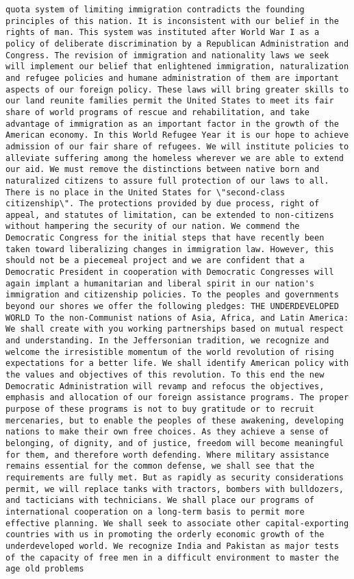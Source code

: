 \documentclass[
]{article}
\begin{document}
\begin{verbatim}
quota system of limiting immigration contradicts the founding principles of this nation. It is inconsistent with our belief in the rights of man. This system was instituted after World War I as a policy of deliberate discrimination by a Republican Administration and Congress. The revision of immigration and nationality laws we seek will implement our belief that enlightened immigration, naturalization and refugee policies and humane administration of them are important aspects of our foreign policy. These laws will bring greater skills to our land reunite families permit the United States to meet its fair share of world programs of rescue and rehabilitation, and take advantage of immigration as an important factor in the growth of the American economy. In this World Refugee Year it is our hope to achieve admission of our fair share of refugees. We will institute policies to alleviate suffering among the homeless wherever we are able to extend our aid. We must remove the distinctions between native born and naturalized citizens to assure full protection of our laws to all. There is no place in the United States for \"second-class citizenship\". The protections provided by due process, right of appeal, and statutes of limitation, can be extended to non-citizens without hampering the security of our nation. We commend the Democratic Congress for the initial steps that have recently been taken toward liberalizing changes in immigration law. However, this should not be a piecemeal project and we are confident that a Democratic President in cooperation with Democratic Congresses will again implant a humanitarian and liberal spirit in our nation's immigration and citizenship policies. To the peoples and governments beyond our shores we offer the following pledges: THE UNDERDEVELOPED WORLD To the non-Communist nations of Asia, Africa, and Latin America: We shall create with you working partnerships based on mutual respect and understanding. In the Jeffersonian tradition, we recognize and welcome the irresistible momentum of the world revolution of rising expectations for a better life. We shall identify American policy with the values and objectives of this revolution. To this end the new Democratic Administration will revamp and refocus the objectives, emphasis and allocation of our foreign assistance programs. The proper purpose of these programs is not to buy gratitude or to recruit mercenaries, but to enable the peoples of these awakening, developing nations to make their own free choices. As they achieve a sense of belonging, of dignity, and of justice, freedom will become meaningful for them, and therefore worth defending. Where military assistance remains essential for the common defense, we shall see that the requirements are fully met. But as rapidly as security considerations permit, we will replace tanks with tractors, bombers with bulldozers, and tacticians with technicians. We shall place our programs of international cooperation on a long-term basis to permit more effective planning. We shall seek to associate other capital-exporting countries with us in promoting the orderly economic growth of the underdeveloped world. We recognize India and Pakistan as major tests of the capacity of free men in a difficult environment to master the age old problems 
\end{verbatim}
\end{document}
